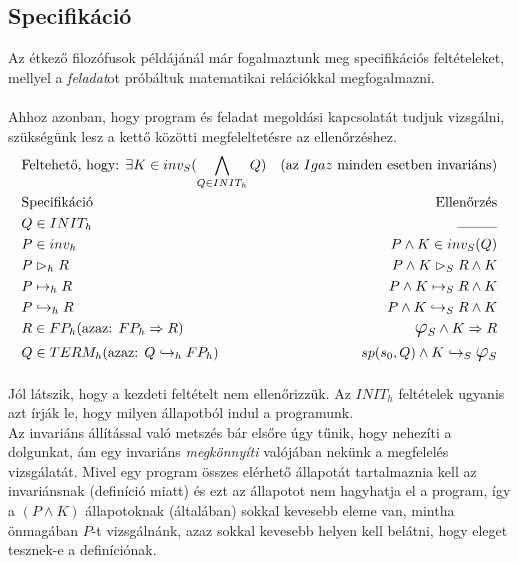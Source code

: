 \documentclass[12pt]{article}
\newcommand{\haromszog}[2]{\ensuremath{#1 \vartriangleright_S #2}}
\newcommand{\egyenesnyil}[2]{\ensuremath{#1 \mapsto_S #2}}
\newcommand{\gorbenyil}[2]{\ensuremath{#1 \hookrightarrow_S #2}}
\newcommand{\fixpont}{\ensuremath{\mathlarger{\mathlarger{\varphi}}_S}}
\begin{document}
	\subsection{Specifikáció}	
	Az étkező filozófusok példájánál már fogalmaztunk meg specifikációs feltételeket, mellyel a \textit{feladat}ot próbáltuk matematikai relációkkal megfogalmazni.
	\paragraph{}Ahhoz azonban, hogy program és feladat megoldási kapcsolatát tudjuk vizsgálni, szükségünk lesz a kettő közötti megfeleltetésre az ellenőrzéshez.
	\begin{align*}
	&\text{Feltehető, hogy: } \exists K \in inv_S ( \bigwedge_{Q \in INIT_h} Q) &(\text{az } Igaz \text{ minden esetben invariáns})\\
	&\text{Specifikáció} &\text{Ellenőrzés} \\
	&Q \in INIT_h &\rule{1cm}{0.3pt}\\
	&P \in inv_h &P \land K \in inv_S(Q)\\
	&P \vartriangleright_h R & \haromszog{P\land K}{R\land K}\\
	&P \mapsto_h R &\egyenesnyil{P\land K}{R \land K}\\
	&P \hookrightarrow_h R &\gorbenyil{P\land K}{R \land K}\\
	&R \in FP_h \text{(azaz: }FP_h \Rightarrow R) & \fixpont \land K \Rightarrow R\\
	&Q \in TERM_h  \text{(azaz: }Q \hookrightarrow_h FP_h) & sp(s_0, Q) \land K \hookrightarrow_S \mathlarger{\mathlarger{\varphi}}_S
	\end{align*}
	
	\paragraph{}
	Jól látszik, hogy a kezdeti feltételt nem ellenőrizzük. Az $INIT_h$ feltételek ugyanis azt írják le, hogy milyen állapotból indul a programunk.\\
	
	Az invariáns állítással való metszés bár elsőre úgy tűnik, hogy nehezíti a dolgunkat, ám egy invariáns \textit{megkönnyíti} valójában nekünk a megfelelés vizsgálatát. Mivel egy program összes elérhető állapotát tartalmaznia kell az invariánsnak (definíció miatt) és ezt az állapotot nem hagyhatja el a program, így a $(P\land K)$ állapotoknak (általában) sokkal kevesebb eleme van, mintha önmagában $P$-t vizsgálnánk, azaz sokkal kevesebb helyen kell belátni, hogy eleget tesznek-e a definíciónak.
	
\end{document}
